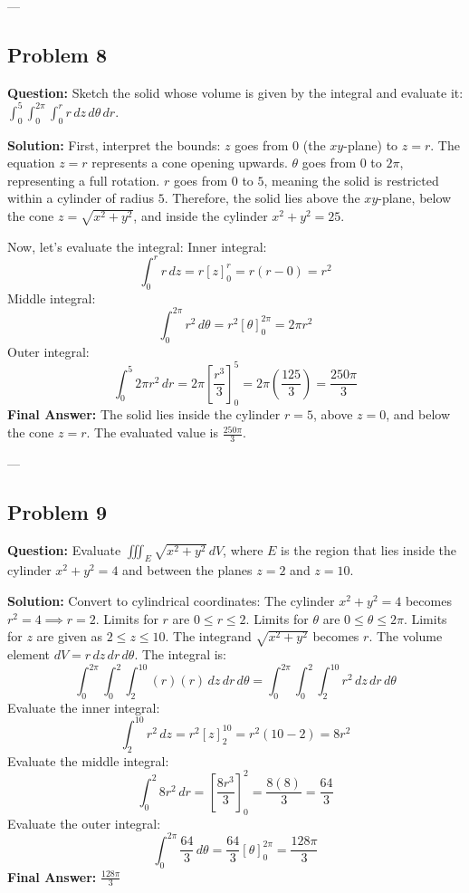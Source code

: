 \documentclass[11pt]{article}
\begin{document}
---

\subsection*{Problem 8}
\textbf{Question:} Sketch the solid whose volume is given by the integral and evaluate it: $\int_0^5 \int_0^{2\pi} \int_0^r r \, dz \, d\theta \, dr$.

\textbf{Solution:}
First, interpret the bounds:
$z$ goes from $0$ (the $xy$-plane) to $z = r$. The equation $z = r$ represents a cone opening upwards.
$\theta$ goes from $0$ to $2\pi$, representing a full rotation.
$r$ goes from $0$ to $5$, meaning the solid is restricted within a cylinder of radius $5$.
Therefore, the solid lies above the $xy$-plane, below the cone $z = \sqrt{x^2 + y^2}$, and inside the cylinder $x^2 + y^2 = 25$.

Now, let's evaluate the integral:
Inner integral:
\[ \int_0^r r \, dz = r [z]_0^r = r(r - 0) = r^2 \]
Middle integral:
\[ \int_0^{2\pi} r^2 \, d\theta = r^2 [\theta]_0^{2\pi} = 2\pi r^2 \]
Outer integral:
\[ \int_0^5 2\pi r^2 \, dr = 2\pi \left[ \frac{r^3}{3} \right]_0^5 = 2\pi \left( \frac{125}{3} \right) = \frac{250\pi}{3} \]
\textbf{Final Answer:} The solid lies inside the cylinder $r=5$, above $z=0$, and below the cone $z=r$. The evaluated value is $\frac{250\pi}{3}$.

---

\subsection*{Problem 9}
\textbf{Question:} Evaluate $\iiint_E \sqrt{x^2 + y^2} \, dV$, where $E$ is the region that lies inside the cylinder $x^2 + y^2 = 4$ and between the planes $z = 2$ and $z = 10$.

\textbf{Solution:}
Convert to cylindrical coordinates:
The cylinder $x^2 + y^2 = 4$ becomes $r^2 = 4 \implies r = 2$. Limits for $r$ are $0 \leq r \leq 2$.
Limits for $\theta$ are $0 \leq \theta \leq 2\pi$.
Limits for $z$ are given as $2 \leq z \leq 10$.
The integrand $\sqrt{x^2 + y^2}$ becomes $r$.
The volume element $dV = r \, dz \, dr \, d\theta$.
The integral is:
\[ \int_0^{2\pi} \int_0^2 \int_2^{10} (r)(r) \, dz \, dr \, d\theta = \int_0^{2\pi} \int_0^2 \int_2^{10} r^2 \, dz \, dr \, d\theta \]
Evaluate the inner integral:
\[ \int_2^{10} r^2 \, dz = r^2 [z]_2^{10} = r^2 (10 - 2) = 8r^2 \]
Evaluate the middle integral:
\[ \int_0^2 8r^2 \, dr = \left[ \frac{8r^3}{3} \right]_0^2 = \frac{8(8)}{3} = \frac{64}{3} \]
Evaluate the outer integral:
\[ \int_0^{2\pi} \frac{64}{3} \, d\theta = \frac{64}{3} [\theta]_0^{2\pi} = \frac{128\pi}{3} \]
\textbf{Final Answer:} $\frac{128\pi}{3}$
\end{document}
